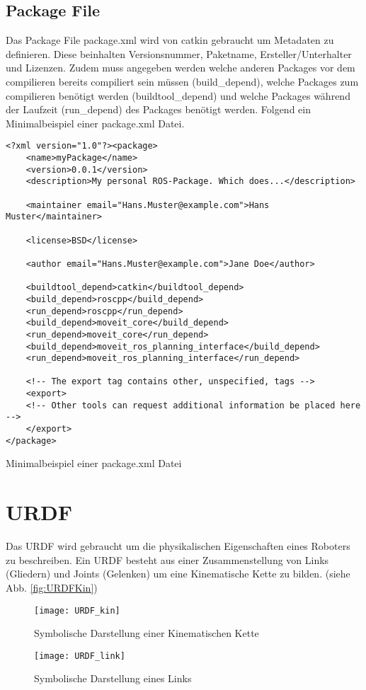 \subsection{Package File} \label{sec:catkinPackageFile}
Das Package File package.xml wird von catkin gebraucht um Metadaten zu definieren. Diese beinhalten Versionsnummer, Paketname, Ersteller/Unterhalter und Lizenzen. Zudem muss angegeben werden welche anderen Packages vor dem compilieren bereits compiliert sein müssen (build\_depend), welche Packages zum compilieren benötigt werden (buildtool\_depend) und welche Packages während der Laufzeit (run\_depend) des Packages benötigt werden. Folgend ein Minimalbeispiel einer package.xml Datei. \cite{Allen2016}
\begin{code}
	\begin{verbatim}
<?xml version="1.0"?><package>
	<name>myPackage</name>
	<version>0.0.1</version>
	<description>My personal ROS-Package. Which does...</description>

	<maintainer email="Hans.Muster@example.com">Hans Muster</maintainer>

	<license>BSD</license>
	
	<author email="Hans.Muster@example.com">Jane Doe</author>

	<buildtool_depend>catkin</buildtool_depend>
	<build_depend>roscpp</build_depend>
	<run_depend>roscpp</run_depend>
	<build_depend>moveit_core</build_depend>
	<run_depend>moveit_core</run_depend>
	<build_depend>moveit_ros_planning_interface</build_depend>
	<run_depend>moveit_ros_planning_interface</run_depend>

	<!-- The export tag contains other, unspecified, tags -->
	<export>
	<!-- Other tools can request additional information be placed here -->
	</export>
</package>
	\end{verbatim}
	\vspace{-15pt}
	\caption{Minimalbeispiel einer package.xml Datei}
	\label{code:PackageXML}
\end{code}

\section{URDF}\label{sec:URDF}
Das \gls{URDF} wird gebraucht um die physikalischen Eigenschaften eines Roboters zu beschreiben. Ein URDF besteht aus einer Zusammenstellung von Links (Gliedern) und Joints (Gelenken) um eine Kinematische Kette zu bilden. (siehe Abb. \ref{fig:URDFKin})
\begin{figure} [h]
	\begin{minipage}[h]{0,49\textwidth}
		\centering
		\texttt{[image: URDF\_kin]}
		\caption[Symbolische Darstellung einer Kinematischen Kette]{Symbolische Darstellung einer Kinematischen Kette \cite{Joseph2015}}
		\label{fig:URDFKin}
	\end{minipage}
	\begin{minipage}[h]{0,49\textwidth}
		\centering
		\texttt{[image: URDF\_link]}
		\caption[Symbolische Darstellung eines Links]{Symbolische Darstellung eines Links \cite{Joseph2015}}
		\label{fig:URDFLink}
	\end{minipage}
\end{figure}

